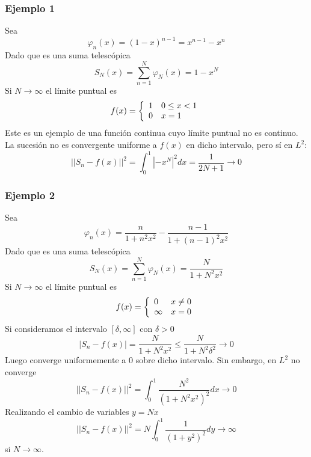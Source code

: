 \subsubsection*{Ejemplo 1}
\noindent Sea
$$\varphi_n(x) = (1-x)^{n-1}=x^{n-1}-x^n$$
Dado que es una suma telescópica
$$S_N(x) = \sum_{n=1}^N\varphi_N(x) = 1-x^N$$
Si $N\to\infty$ el límite puntual es
\begin{equation*}
f(x) = \left\{
\begin{array}{l l}
1& 0\le x < 1\\
0 & x = 1
\end{array}
\right.
\end{equation*}
Este es un ejemplo de una función continua cuyo límite puntual no es continuo. La sucesión no es convergente uniforme a $f(x)$ en dicho intervalo, pero sí en $L^2$:
$$||S_n-f(x)||^2 = \int_0^1 |-x^N|^2dx =\frac{1}{2N+1} \to 0$$

\subsubsection*{Ejemplo 2}
\noindent Sea
$$\varphi_n(x) = \frac{n}{1+n^2x^2}-\frac{n-1}{1+(n-1)^2x^2}$$
Dado que es una suma telescópica
$$S_N(x) = \sum_{n=1}^N\varphi_N(x) = \frac{N}{1+N^2x^2}$$
Si $N\to\infty$ el límite puntual es
\begin{equation*}
f(x) = \left\{
\begin{array}{l l}
0 & x\neq 0\\
\infty & x = 0
\end{array}
\right.
\end{equation*}
Si consideramos el intervalo $[\delta, \infty]$ con $\delta > 0$
$$|S_n-f(x)|=\frac{N}{1+N^2x^2}\le \frac{N}{1+N^2\delta^2}\to 0$$
Luego converge uniformemente a $0$ sobre dicho intervalo.
Sin embargo, en $L^2$ no converge
$$||S_n-f(x)||^2 = \int_0^1 \frac{N^2}{(1+N^2x^2)^2}dx\to 0$$
Realizando el cambio de variables $y=Nx$
$$||S_n-f(x)||^2 = N\int_0^1 \frac{1}{(1+y^2)^2}dy\to\infty$$
si $N\to \infty$.
